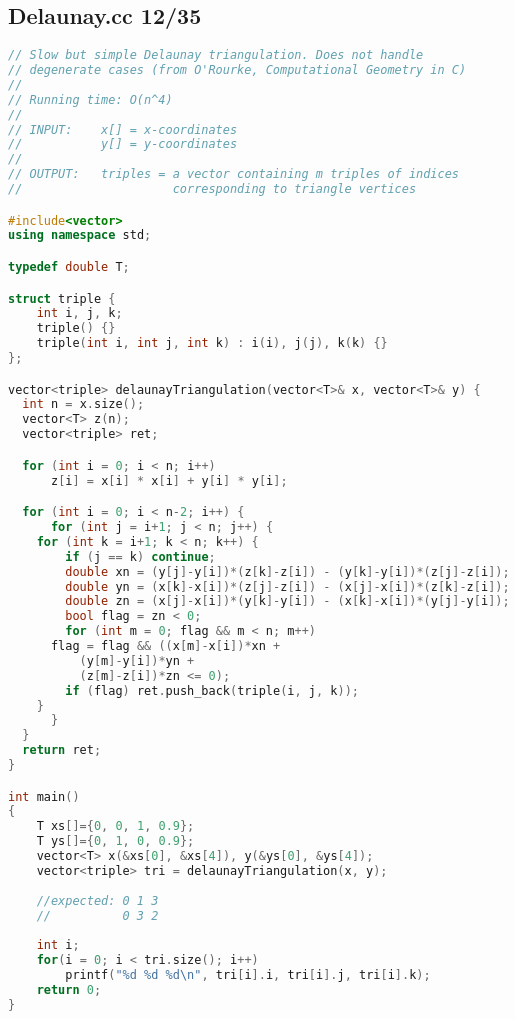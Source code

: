 \subsection{Delaunay.cc 12/35}
\begin{lstlisting}[language=C++]
// Slow but simple Delaunay triangulation. Does not handle
// degenerate cases (from O'Rourke, Computational Geometry in C)
//
// Running time: O(n^4)
//
// INPUT:    x[] = x-coordinates
//           y[] = y-coordinates
//
// OUTPUT:   triples = a vector containing m triples of indices
//                     corresponding to triangle vertices

#include<vector>
using namespace std;

typedef double T;

struct triple {
    int i, j, k;
    triple() {}
    triple(int i, int j, int k) : i(i), j(j), k(k) {}
};

vector<triple> delaunayTriangulation(vector<T>& x, vector<T>& y) {
  int n = x.size();
  vector<T> z(n);
  vector<triple> ret;

  for (int i = 0; i < n; i++)
      z[i] = x[i] * x[i] + y[i] * y[i];

  for (int i = 0; i < n-2; i++) {
      for (int j = i+1; j < n; j++) {
    for (int k = i+1; k < n; k++) {
        if (j == k) continue;
        double xn = (y[j]-y[i])*(z[k]-z[i]) - (y[k]-y[i])*(z[j]-z[i]);
        double yn = (x[k]-x[i])*(z[j]-z[i]) - (x[j]-x[i])*(z[k]-z[i]);
        double zn = (x[j]-x[i])*(y[k]-y[i]) - (x[k]-x[i])*(y[j]-y[i]);
        bool flag = zn < 0;
        for (int m = 0; flag && m < n; m++)
      flag = flag && ((x[m]-x[i])*xn + 
          (y[m]-y[i])*yn + 
          (z[m]-z[i])*zn <= 0);
        if (flag) ret.push_back(triple(i, j, k));
    }
      }
  }
  return ret;
}

int main()
{
    T xs[]={0, 0, 1, 0.9};
    T ys[]={0, 1, 0, 0.9};
    vector<T> x(&xs[0], &xs[4]), y(&ys[0], &ys[4]);
    vector<triple> tri = delaunayTriangulation(x, y);
    
    //expected: 0 1 3
    //          0 3 2
    
    int i;
    for(i = 0; i < tri.size(); i++)
        printf("%d %d %d\n", tri[i].i, tri[i].j, tri[i].k);
    return 0;
}

\end{lstlisting}
